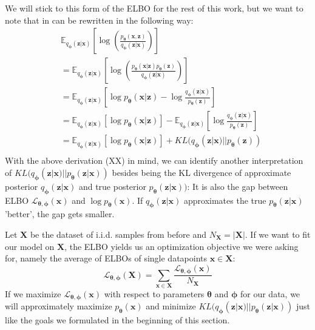 \documentclass[12pt]{report}
\theoremstyle{definition}
\begin{document}
We will stick to this form of the ELBO for the rest of this work, but we want to note that in can be rewritten in the following way:
\begin{equation}
\begin{split}
& \mathbb{E}_{q_{\mathbf{\phi}}(\mathbf{z}|\mathbf{x})}\left[ \log\left(\frac{p_{\mathbf{\theta}}(\mathbf{x}, \mathbf{z})}{q_{\mathbf{\phi}}(\mathbf{z}|\mathbf{x})}\right) \right] \\
& = \mathbb{E}_{q_{\mathbf{\phi}}(\mathbf{z}|\mathbf{x})}\left[ \log\left(\frac{p_{\mathbf{\theta}}(\mathbf{x}|\mathbf{z})p_{\mathbf{\theta}}(\mathbf{z})}{q_{\mathbf{\phi}}(\mathbf{z}|\mathbf{x})}\right) \right] \\
	& = \mathbb{E}_{q_{\mathbf{\phi}}(\mathbf{z}|\mathbf{x})}\left[ \log p_{\mathbf{\theta}}(\mathbf{x}| \mathbf{z}) - \log \frac{q_{\mathbf{\phi}}(\mathbf{z}|\mathbf{x})}{p_{\mathbf{\theta}}(\mathbf{z})} \right]	\\
	& = \mathbb{E}_{q_{\mathbf{\phi}}(\mathbf{z}|\mathbf{x})}\left[ \log p_{\mathbf{\theta}}(\mathbf{x}| \mathbf{z})\right] - \mathbb{E}_{q_{\mathbf{\phi}}(\mathbf{z}|\mathbf{x})}\left[\log \frac{q_{\mathbf{\phi}}(\mathbf{z}|\mathbf{x})}{p_{\mathbf{\theta}}(\mathbf{z})} \right]	\\
	& = \mathbb{E}_{q_{\mathbf{\phi}}(\mathbf{z}|\mathbf{x})}\left[ \log p_{\mathbf{\theta}}(\mathbf{x}| \mathbf{z})\right] + KL(q_{\mathbf{\phi}}(\mathbf{z}|\mathbf{x})||p_{\mathbf{\theta}}(\mathbf{z}))\\	
\end{split}
\end{equation}
With the above derivation (XX) in mind, we can identify another interpretation of $KL(q_{\mathbf{\phi}}(\mathbf{z}|\mathbf{x}) || p_{\mathbf{\theta}}(\mathbf{z}|\mathbf{x}))$ besides being the KL divergence of approximate posterior $q_{\mathbf{\phi}}(\mathbf{z}|\mathbf{x})$ and true posterior $p_{\mathbf{\theta}}(\mathbf{z}| \mathbf{x}))$: It is also the gap between ELBO $\mathcal{L}_{\mathbf{\theta}, \mathbf{\phi}}(\mathbf{x})$ and $\log p_{\mathbf{\theta}}(\mathbf{x})$. If $q_{\mathbf{\phi}}(\mathbf{z}|\mathbf{x})$ approximates the true $p_{\mathbf{\theta}}(\mathbf{z}|\mathbf{x})$ 'better', the gap gets smaller.

Let $\mathbf{X}$ be the dataset of i.i.d. samples from before and $N_{\mathbf{X}} = |\mathbf{X}|$. If we want to fit our model on $\mathbf{X}$, the ELBO yields us an optimization objective we were asking for, namely the average of ELBOs of single datapoints $\mathbf{x} \in \mathbf{X}$:
\begin{equation}
	\mathcal{L}_{\mathbf{\theta}, \mathbf{\phi}}(\mathbf{X}) = \sum_{\mathbf{x} \in \mathbf{X}} \frac{\mathcal{L}_{\mathbf{\theta}, \mathbf{\phi}}(\mathbf{x})}{N_{\mathbf{X}}}
\end{equation}
If we maximize $\mathcal{L}_{\mathbf{\theta}, \mathbf{\phi}}(\mathbf{x})$ with respect to parameters $\pmb{\theta}$ and $\pmb{\phi}$ for our data, we will approximately maximize $p_{\mathbf{\theta}}(\mathbf{x})$ and minimize $KL(q_{\mathbf{\phi}}(\mathbf{z}|\mathbf{x}) || p_{\mathbf{\theta}}(\mathbf{z}| \mathbf{x}))$ just like the goals we formulated in the beginning of this section.
\end{document}
